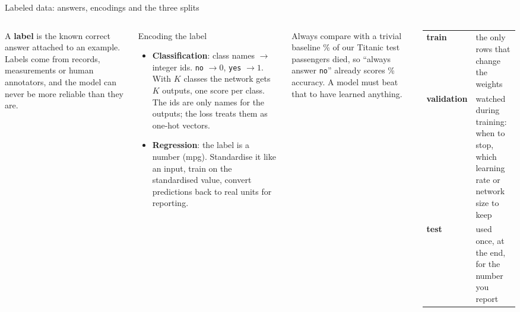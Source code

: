 \documentclass[aspectratio=169,10pt]{beamer}
\newcommand{\key}[1]{\textbf{\color{cAtt}#1}}
\begin{document}
\begin{frame}{Labeled data: answers, encodings and the three splits}
\begin{columns}[T,onlytextwidth]
\small
A \key{label} is the known correct answer attached to an example. Labels come from records,
measurements or human annotators, and the model can never be more reliable than they are.

\vspace{1mm}
\begin{block}{Encoding the label}
\footnotesize
\begin{itemize}
  \item \textbf{Classification}: class names $\to$ integer ids. \texttt{no} $\to0$, \texttt{yes} $\to1$.
        With $K$ classes the network gets $K$ outputs, one score per class. The ids are only
        names for the outputs; the loss treats them as one-hot vectors.
  \item \textbf{Regression}: the label is a number (mpg). Standardise it like an input, train on
        the standardised value, convert predictions back to real units for reporting.
\end{itemize}
\end{block}
\begin{block}{Always compare with a trivial baseline}
\footnotesize
\titanicBaseAcc\% of our Titanic test passengers died, so ``always answer \texttt{no}'' already scores
\titanicBaseAcc\% accuracy. A model must beat that to have learned anything.
\end{block}
\centering
{}

\vspace{1mm}
\raggedright\small
{\footnotesize
\renewcommand{\arraystretch}{1.2}
\begin{tabular}{@{}lp{58mm}@{}}
\toprule
\textbf{train} & the only rows that change the weights\\
\textbf{validation} & watched during training: when to stop, which learning rate or network size to keep\\
\textbf{test} & used once, at the end, for the number you report\\
\bottomrule
\end{tabular}}


\end{columns}
\end{frame}
\end{document}
